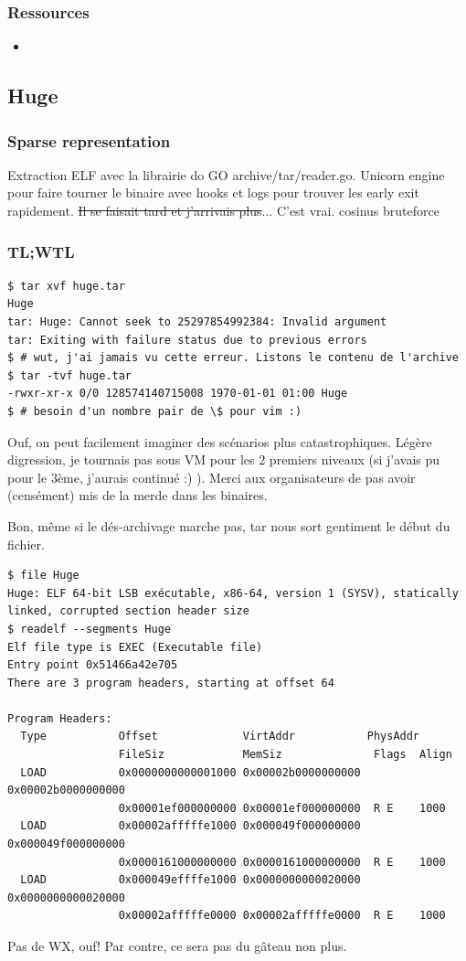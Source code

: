 \documentclass[14pt]{article}
\begin{document}
\subsubsection{Ressources}
\begin{itemize}
\item {}
\end{itemize}



\FloatBarrier
\subsection{Huge}
\subsubsection{Sparse representation}
Extraction ELF avec la librairie do GO archive/tar/reader.go.
Unicorn engine pour faire tourner le binaire avec hooks et logs pour trouver les early exit rapidement.
\sout{Il se faisait tard et j'arrivais plus}... C'est vrai. cosinus bruteforce

\subsubsection{TL;WTL}
\begin{verbatim}
$ tar xvf huge.tar
Huge
tar: Huge: Cannot seek to 25297854992384: Invalid argument
tar: Exiting with failure status due to previous errors
$ # wut, j'ai jamais vu cette erreur. Listons le contenu de l'archive
$ tar -tvf huge.tar
-rwxr-xr-x 0/0 128574140715008 1970-01-01 01:00 Huge
$ # besoin d'un nombre pair de \$ pour vim :)
\end{verbatim}
Ouf, on peut facilement imaginer des scénarios plus catastrophiques. Légère digression, je tournais pas sous VM pour les 2 premiers niveaux (si j'avais pu pour le 3ème, j'aurais continué :) ). Merci aux organisateurs de pas avoir (censément) mis de la merde dans les binaires.

Bon, même si le dés-archivage marche pas, tar nous sort gentiment le début du fichier.

\begin{verbatim}
$ file Huge
Huge: ELF 64-bit LSB exécutable, x86-64, version 1 (SYSV), statically linked, corrupted section header size
$ readelf --segments Huge
Elf file type is EXEC (Executable file)
Entry point 0x51466a42e705
There are 3 program headers, starting at offset 64

Program Headers:
  Type           Offset             VirtAddr           PhysAddr
                 FileSiz            MemSiz              Flags  Align
  LOAD           0x0000000000001000 0x00002b0000000000 0x00002b0000000000
                 0x00001ef000000000 0x00001ef000000000  R E    1000
  LOAD           0x00002afffffe1000 0x000049f000000000 0x000049f000000000
                 0x0000161000000000 0x0000161000000000  R E    1000
  LOAD           0x000049effffe1000 0x0000000000020000 0x0000000000020000
                 0x00002afffffe0000 0x00002afffffe0000  R E    1000
\end{verbatim}
Pas de WX, ouf! Par contre, ce sera pas du gâteau non plus.
\end{document}
